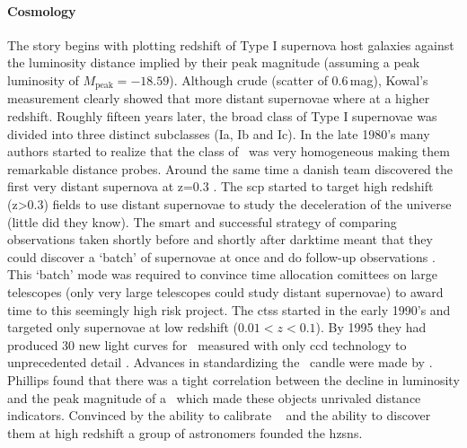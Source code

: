 \paragraph{ Cosmology}
The story begins with \citet{1968AJ.....73.1021K} plotting redshift of Type I supernova host galaxies against the luminosity distance implied by their peak magnitude (assuming a peak luminosity of $M_\textrm{peak}=-18.59$). Although crude (scatter of 0.6\,mag), Kowal's measurement clearly showed that more distant supernovae where at a higher redshift. Roughly fifteen years later, the broad class of Type I supernovae was divided into three distinct subclasses (Ia, Ib and Ic). In the late 1980's many authors started to realize that the class of \sneia\ was very homogeneous \citep[][and references therein]{1992ARA&A..30..359B} making them remarkable  distance probes. Around the same time a danish team discovered the first very distant supernova at z=0.3 \citep{1989Natur.339..523N}. The \gls{scp} started to target high redshift (z>0.3) fields to use distant supernovae to study the deceleration of the universe (little did they know). The smart and successful strategy of comparing observations taken shortly before and shortly after darktime meant that they could discover a `batch' of supernovae at once and do follow-up observations  \citep{1995STIN...9629501P}. This `batch' mode was required to convince time allocation comittees on large telescopes (only very large telescopes could study distant supernovae) to award time to this seemingly high risk project. The \gls{ctss} started in the early 1990's and targeted only supernovae at low redshift ($0.01 < z < 0.1$). By 1995 they had produced 30 new light curves for \sneia\ measured with only \gls{ccd} technology to unprecedented detail \citep{1995AJ....109....1H}. Advances in standardizing the \snia\ candle were made by \citet{1993ApJ...413L.105P}. Phillips found that there was a tight correlation between the decline in luminosity and the peak magnitude of a \snia\ which made these objects unrivaled distance indicators. Convinced by the ability to calibrate \sneia\ \citep{1993ApJ...413L.105P} and the ability to discover them at high redshift  \citep{1995STIN...9629501P} a group of astronomers founded the \gls{hzsns}. 

